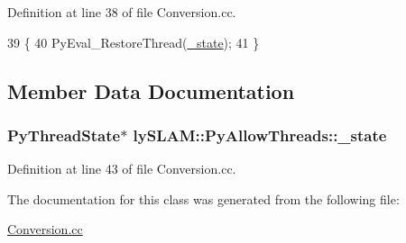 Definition at line 38 of file Conversion.\+cc.


\begin{DoxyCode}
39     \{
40         PyEval\_RestoreThread(\hyperlink{classlySLAM_1_1PyAllowThreads_ac8076cd04c356e648d9ae5e28cd0d4aa}{\_state});
41     \}
\end{DoxyCode}


\subsection{Member Data Documentation}
\subsubsection[{\texorpdfstring{\+\_\+state}{_state}}]{\setlength{\rightskip}{0pt plus 5cm}Py\+Thread\+State$\ast$ ly\+S\+L\+A\+M\+::\+Py\+Allow\+Threads\+::\+\_\+state\hspace{0.3cm}{\ttfamily [private]}}\hypertarget{classlySLAM_1_1PyAllowThreads_ac8076cd04c356e648d9ae5e28cd0d4aa}{}\label{classlySLAM_1_1PyAllowThreads_ac8076cd04c356e648d9ae5e28cd0d4aa}


Definition at line 43 of file Conversion.\+cc.



The documentation for this class was generated from the following file\+:\begin{DoxyCompactItemize}
\item 
\hyperlink{Conversion_8cc}{Conversion.\+cc}\end{DoxyCompactItemize}
